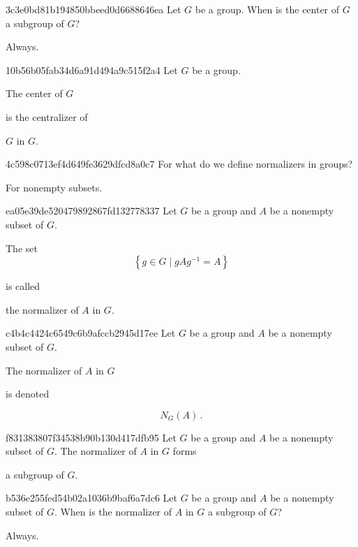 \begin{note}{3c3e0bd81b194850bbeed0d6688646ea}
    Let \({ G }\) be a group.
    When is the center of \({ G }\) a subgroup of \({ G }\)?

    \begin{cloze}{1}
        Always.
    \end{cloze}
\end{note}

\begin{note}{10b56b05fab34d6a91d494a9c515f2a4}
    Let \({ G }\) be a group.
    \begin{icloze}{2}The center of \({ G }\)\end{icloze} is the centralizer of \begin{icloze}{1}\({ G }\) in \({ G }\).\end{icloze}
\end{note}

\begin{note}{4c598c0713ef4d649fe3629dfcd8a0c7}
    For what do we define normalizers in groups?

    \begin{cloze}{1}
        For nonempty subsets.
    \end{cloze}
\end{note}

\begin{note}{ea05e39de520479892867fd132778337}
    Let \({ G }\) be a group and \({ A }\) be a nonempty subset of \({ G }\).
    \begin{icloze}{2}
        The set
        \[
            \left\{ g \in G \mid gAg^{-1} = A \right\}
        \]
    \end{icloze}
    is called \begin{icloze}{1}the normalizer of \({ A }\) in \({ G }\).\end{icloze}
\end{note}

\begin{note}{c4b4c4424c6549c6b9afccb2945d17ee}
    Let \({ G }\) be a group and \({ A }\) be a nonempty subset of \({ G }\).
    \begin{icloze}{2}The normalizer of \({ A }\) in \({ G }\)\end{icloze} is denoted
    \begin{icloze}{1}
        \[
            N_G(A)\,.
        \]
    \end{icloze}
\end{note}

\begin{note}{f831383807f34538b90b130d417dfb95}
    Let \({ G }\) be a group and \({ A }\) be a nonempty subset of \({ G }\).
    The normalizer of \({ A }\) in \({ G }\) forms \begin{icloze}{1}a subgroup of \({ G }\).\end{icloze}
\end{note}

\begin{note}{b536e255fed54b02a1036b9baf6a7dc6}
    Let \({ G }\) be a group and \({ A }\) be a nonempty subset of \({ G }\).
    When is the normalizer of \({ A }\) in \({ G }\) a subgroup of \({ G }\)?

    \begin{cloze}{1}
        Always.
    \end{cloze}
\end{note}


